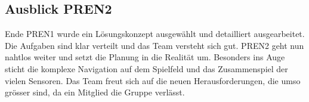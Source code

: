 \subsection{Ausblick PREN2}

Ende PREN1 wurde ein Lösungskonzept ausgewählt und detailliert ausgearbeitet.
Die Aufgaben sind klar verteilt und das Team versteht sich gut. PREN2 geht nun nahtlos weiter und setzt die Planung in die Realität um.
Besonders ins Auge sticht die komplexe Navigation auf dem Spielfeld und das Zusammenspiel der vielen Sensoren.
Das Team freut sich auf die neuen Herausforderungen, die umso grösser sind, da ein Mitglied die Gruppe verlässt.

